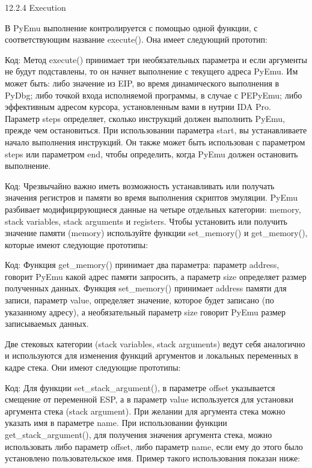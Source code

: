 \documentclass[12pt, a4paper, oneside]{book}
\begin{document}
12.2.4 Execution

В PyEmu выполнение контролируется с помощью одной функции, с соответствующим название execute(). Она имеет следующий прототип:

Код:
Метод execute() принимает три необязательных параметра и если аргументы не будут подставлены, то он начнет выполнение с текущего адреса PyEmu. Им может быть: либо значение из EIP, во время динамического выполнения в PyDbg; либо точкой входа исполняемой программы, в случае с PEPyEmu; либо эффективным адресом курсора, установленным вами в нутрии IDA Pro. Параметр steps определяет, сколько инструкций должен выполнить PyEmu, прежде чем остановиться. При использовании параметра start, вы устанавливаете начало выполнения инструкций. Он также может быть использован с параметром steps или параметром end, чтобы определить, когда PyEmu должен остановить выполнение.

Код:
Чрезвычайно важно иметь возможность устанавливать или получать значения регистров и памяти во время выполнения скриптов эмуляции. PyEmu разбивает модифицирующиеся данные на четыре отдельных категории: memory, stack variables, stack arguments и registers. Чтобы установить или получить значение памяти (memory) используйте функции set\_memory() и get\_memory(), которые имеют следующие прототипы: 

Код:
Функция get\_memory() принимает два параметра: параметр address, говорит PyEmu какой адрес памяти запросить, а параметр size определяет размер полученных данных. Функция set\_memory() принимает address памяти для записи, параметр value, определяет значение, которое будет записано (по указанному адресу), а необязательный параметр size говорит PyEmu размер записываемых данных. 

Две стековых категории (stack variables, stack arguments) ведут себя аналогично и используются для изменения функций аргументов и локальных переменных в кадре стека. Они имеют следующие прототипы:

Код:
Для функции set\_stack\_argument(), в параметре offset указывается смещение от переменной ESP, а в параметр value используется для установки аргумента стека (stack argument). При желании для аргумента стека можно указать имя в параметре name. При использовании функции get\_stack\_argument(), для получения значения аргумента стека, можно использовать либо параметр offset, либо параметр name, если ему до этого было установлено пользовательское имя. Пример такого использования показан ниже:
\end{document}
